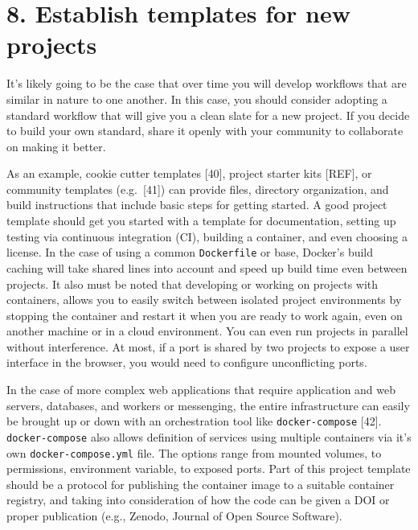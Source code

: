\documentclass[10pt,letterpaper]{article}
\begin{document}
\hypertarget{establish-templates-for-new-projects}{%
\section*{8. Establish templates for new
projects}\label{establish-templates-for-new-projects}}

It's likely going to be the case that over time you will develop
workflows that are similar in nature to one another. In this case, you
should consider adopting a standard workflow that will give you a clean
slate for a new project. If you decide to build your own standard, share
it openly with your community to collaborate on making it better.

As an example, cookie cutter templates {[}40{]}, project starter kits
{[}REF{]}, or community templates (e.g.~{[}41{]}) can provide files,
directory organization, and build instructions that include basic steps
for getting started. A good project template should get you started with
a template for documentation, setting up testing via continuous
integration (CI), building a container, and even choosing a license. In
the case of using a common \texttt{Dockerfile} or base, Docker's build
caching will take shared lines into account and speed up build time even
between projects. It also must be noted that developing or working on
projects with containers, allows you to easily switch between isolated
project environments by stopping the container and restart it when you
are ready to work again, even on another machine or in a cloud
environment. You can even run projects in parallel without interference.
At most, if a port is shared by two projects to expose a user interface
in the browser, you would need to configure unconflicting ports.

In the case of more complex web applications that require application
and web servers, databases, and workers or messenging, the entire
infrastructure can easily be brought up or down with an orchestration
tool like \texttt{docker-compose} {[}42{]}. \texttt{docker-compose} also
allows definition of services using multiple containers via it's own
\texttt{docker-compose.yml} file. The options range from mounted
volumes, to permissions, environment variable, to exposed ports. Part of
this project template should be a protocol for publishing the container
image to a suitable container registry, and taking into consideration of
how the code can be given a DOI or proper publication (e.g., Zenodo,
Journal of Open Source Software).
\end{document}
